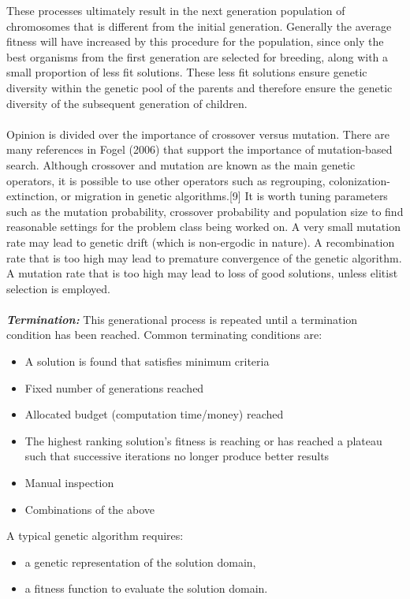 \documentclass[a4paper, 12pt]{article}
\begin{document}
\noindent
These processes ultimately result in the next generation population of chromosomes that is different from the initial generation. Generally the average fitness will have increased by this procedure for the population, since only the best organisms from the first generation are selected for breeding, along with a small proportion of less fit solutions. These less fit solutions ensure genetic diversity within the genetic pool of the parents and therefore ensure the genetic diversity of the subsequent generation of children.\\~\\
\noindent
Opinion is divided over the importance of crossover versus mutation. There are many references in Fogel (2006) that support the importance of mutation-based search. Although crossover and mutation are known as the main genetic operators, it is possible to use other operators such as regrouping, colonization-extinction, or migration in genetic algorithms.[9] It is worth tuning parameters such as the mutation probability, crossover probability and population size to find reasonable settings for the problem class being worked on. A very small mutation rate may lead to genetic drift (which is non-ergodic in nature). A recombination rate that is too high may lead to premature convergence of the genetic algorithm. A mutation rate that is too high may lead to loss of good solutions, unless elitist selection is employed.\\~\\
\textbf{\textit{Termination:}}
This generational process is repeated until a termination condition has been reached. Common terminating conditions are:
\begin{itemize}
\item A solution is found that satisfies minimum criteria
\item Fixed number of generations reached
\item Allocated budget (computation time/money) reached
\item The highest ranking solution's fitness is reaching or has reached a plateau such that successive iterations no longer produce better results
\item Manual inspection
\item Combinations of the above
\end{itemize}
A typical genetic algorithm requires:
\begin{itemize}
\item a genetic representation of the solution domain,
\item a fitness function to evaluate the solution domain.
\end{itemize}
\end{document}
